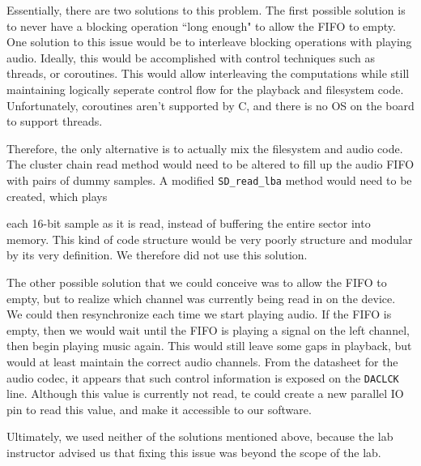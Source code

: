 \documentclass[12pt]{article}
\begin{document}

Essentially, there are two solutions to this problem.
The first possible solution is to never have a blocking operation ``long enough"
to allow the FIFO to empty.
One solution to this issue would be to interleave blocking operations with playing
audio.
Ideally, this would be accomplished with control techniques such as threads, or
coroutines.
This would allow interleaving the computations while still maintaining logically
seperate control flow for the playback and filesystem code.
Unfortunately, coroutines aren't supported by C, and there is no OS on the board
to support threads.

Therefore, the only alternative is to actually mix the filesystem and audio code.
The cluster chain read method would need to be altered to fill up the audio FIFO
with pairs of dummy samples.
A modified \texttt{SD\_read\_lba} method would need to be created, which plays

each 16-bit sample as it is read, instead of buffering the entire sector into
memory.
This kind of code structure would be very poorly structure and modular by its
very definition.
We therefore did not use this solution.

The other possible solution that we could conceive was to allow the FIFO to
empty, but to realize which channel was currently being read in on the device.
We could then resynchronize each time we start playing audio.
If the FIFO is empty, then we would wait until the FIFO is playing a signal on
the left channel, then begin playing music again.
This would still leave some gaps in playback, but would at least maintain
the correct audio channels.
From the datasheet for the audio codec, it appears that such control information
is exposed on the \texttt{DACLCK} line.
Although this value is currently not read, te could create a new parallel IO pin
to read this value, and make it accessible to our software.

Ultimately, we used neither of the solutions mentioned above, because the lab
instructor advised us that fixing this issue was beyond the scope of the lab.
\end{document}
